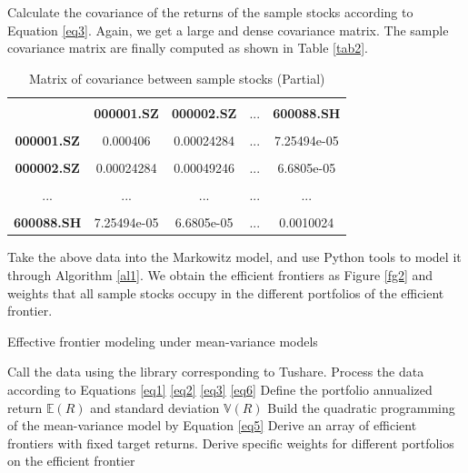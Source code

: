 \documentclass[default,iicol]{sn-jnl}%
\begin{document}
Calculate the covariance of the returns of the sample stocks according to Equation \eqref{eq3}. Again, we get a large and dense covariance matrix. The sample covariance matrix are finally computed as shown in Table \eqref{tab2}.
\begin{table}[htbp]
	\centering  
	\begin{tabular}{|c|c|c|c|c|}  
		\hline  %
		& & & &\\[-6pt]  %
		 &\textbf{000001.SZ}&\textbf{000002.SZ}&...&\textbf{600088.SH} \\  
		\hline
		& & & & \\[-6pt]
		\textbf{000001.SZ}&0.000406&0.00024284&...&7.25494e-05 \\
		\hline
		& & & & \\[-6pt]
		\textbf{000002.SZ}&0.00024284&0.00049246&...&6.6805e-05 \\
		\hline
		& & & & \\[-6pt]
		...&...&...&...&... \\
		\hline
		& & & & \\[-6pt]
		\textbf{600088.SH}&7.25494e-05&6.6805e-05&...&0.0010024 \\
		\hline
	\end{tabular}
	\caption{Matrix of covariance between sample stocks (Partial)} 
	\label{tab2}
\end{table}

Take the above data into the Markowitz model, and use Python tools to model it through Algorithm \ref{al1}. We obtain the efficient frontiers as Figure \ref{fg2} and weights that all sample stocks occupy in the different portfolios of the efficient frontier.
\begin{algorithm}
	\caption{Effective frontier modeling under mean-variance models}
	\label{al1}
	\begin{algorithmic}[1]
		\State Call the data using the library corresponding to Tushare.
		\State Process the data according to Equations \eqref{eq1} \eqref{eq2} \eqref{eq3} \eqref{eq6}
		\State Define the portfolio annualized return $\mathbb{E}(R)$ and standard deviation $\mathbb{V}(R)$
		\State Build the quadratic programming of the mean-variance model by Equation \eqref{eq5}
		\State Derive an array of efficient frontiers with fixed target returns.
		\State Derive specific weights for different portfolios on the efficient frontier
	\end{algorithmic}
\end{algorithm}
\end{document}

